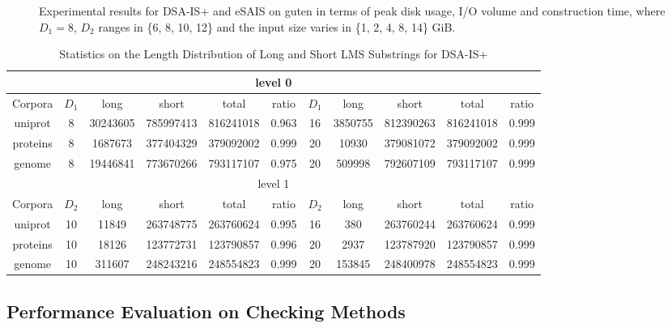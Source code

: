 \documentclass[10pt,journal,compsoc]{IEEEtran}
\begin{document}
\begin{figure}[htbp]
{		\label{subfig:ct_cmp3}
	}
	\caption{Experimental results for DSA-IS+ and eSAIS on guten in terms of peak disk usage, I/O volume and construction time, where $D_1 = 8$, $D_2$ ranges in \{6, 8, 10, 12\} and the input size varies in \{1, 2, 4, 8, 14\} GiB. }
	\label{fig:performance_analysis3}
\end{figure}


\begin{table}[htbp]
	\caption{Statistics on the Length Distribution of Long and Short LMS Substrings for DSA-IS+}
	\label{tbl:long_short_distribution}	
	\centering
	\begin{tabular}{|c|c|c|c|c|c|c|c|c|c|c|}
		\hline
		\multicolumn{11}{|c|}{level 0} \\\hline
		Corpora & $D_1$ & long & short & total & ratio & $D_1$ & long & short & total & ratio\\\hline
		uniprot & 8 & 30243605 & 785997413 & 816241018 & 0.963 & 16 & 3850755 & 812390263 & 816241018 & 0.999\\\hline
		proteins & 8 & 1687673 & 377404329 & 379092002 & 0.999 & 20 & 10930 & 379081072 & 379092002 & 0.999\\\hline
		genome & 8 & 19446841 & 773670266 & 793117107 & 0.975 & 20 & 509998 & 792607109 & 793117107 & 0.999\\\hline
		\multicolumn{11}{|c|}{level 1}\\\hline
		Corpora & $D_2$ & long & short & total & ratio & $D_2$ & long & short & total & ratio\\\hline
		uniprot & 10 & 11849 & 263748775 & 263760624 & 0.995 & 16 & 380 & 263760244 & 263760624 & 0.999\\\hline
		proteins & 10 & 18126 & 123772731 & 123790857 & 0.996 & 20 & 2937 & 123787920 & 123790857 & 0.999\\\hline
		genome & 10 & 311607 & 248243216 & 248554823 & 0.999 & 20 & 153845 & 248400978 & 248554823 & 0.999\\\hline
	\end{tabular}
\end{table}%


\subsection{Performance Evaluation on Checking Methods}
\end{document}
